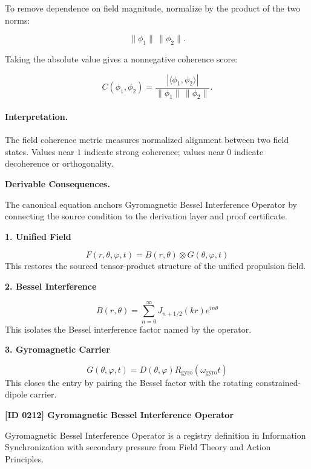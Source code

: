To remove dependence on field magnitude, normalize by the product of the two norms:

\begin{equation}
\lVert \phi_1\rVert\,\lVert \phi_2\rVert .
\end{equation}

Taking the absolute value gives a nonnegative coherence score:

\begin{equation}
\boxed{
C(\phi_1,\phi_2)
=
\frac{
\left|\langle \phi_1,\phi_2\rangle\right|
}{
\lVert \phi_1\rVert\,\lVert \phi_2\rVert
}.
}
\end{equation}

\paragraph{Interpretation.}
The field coherence metric measures normalized alignment between two field states. Values near $1$ indicate strong coherence; values near $0$ indicate decoherence or orthogonality.

\par\vspace{0.35em}
\noindent\textbf{Derivable Consequences.}\quad
\begingroup
\footnotesize
\raggedright
The canonical equation anchors Gyromagnetic Bessel Interference Operator by connecting the source condition to the derivation layer and proof certificate.
\par\endgroup

\noindent\textbf{1. Unified Field}\par
\[
F(r,\theta,\varphi,t)=B(r,\theta)\otimes G(\theta,\varphi,t)
\]
\noindent This restores the sourced tensor-product structure of the unified propulsion field.\par
\noindent\textbf{2. Bessel Interference}\par
\[
B(r,\theta)=\sum_{n=0}^{\infty}J_{n+1/2}(k r)e^{i n\theta}
\]
\noindent This isolates the Bessel interference factor named by the operator.\par
\noindent\textbf{3. Gyromagnetic Carrier}\par
\[
G(\theta,\varphi,t)=D(\theta,\varphi)R_{\mathrm{gyro}}(\omega_{\mathrm{gyro}}t)
\]
\noindent This closes the entry by pairing the Bessel factor with the rotating constrained-dipole carrier.\par

\clearpage
\noindent\textbf{[ID 0212] Gyromagnetic Bessel Interference Operator}\par
\vspace{0.35em}
\begingroup\small
{}
Gyromagnetic Bessel Interference Operator is a registry definition in Information Synchronization with secondary pressure from Field Theory and Action Principles.


